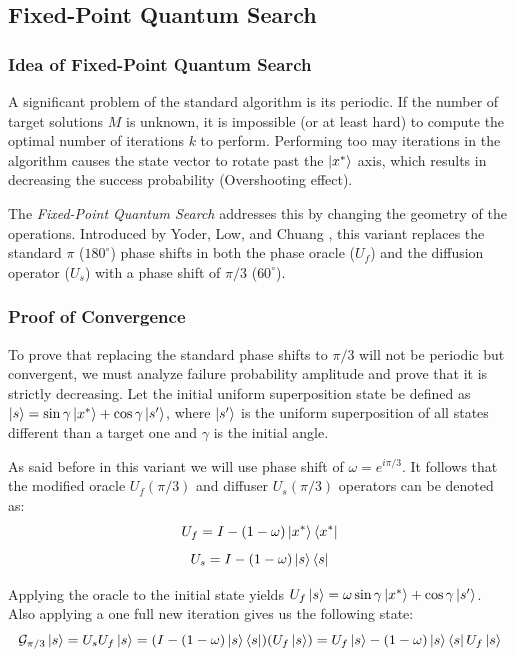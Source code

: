 \subsection{Fixed-Point Quantum Search}
%
%
\subsubsection{Idea of Fixed-Point Quantum Search}

A significant problem of the standard algorithm is its periodic. 
If the number of target solutions $M$ is unknown, it is impossible (or at least hard) to compute the optimal number of iterations $k$ to perform. 
Performing too may iterations in the algorithm causes the state vector to rotate past the $\ket{x^*}$ axis, which results in
decreasing the success probability (Overshooting effect).
%
%

\bigskip
The \textit{Fixed-Point Quantum Search} addresses this by changing the geometry of the operations. 
Introduced by Yoder, Low, and Chuang \cite{yoder2014fixed}, this variant replaces the standard $\pi$ ($180^\circ$) 
phase shifts in both the phase oracle ($U_f$) and the diffusion operator ($U_s$) with a phase shift of $\pi/3$ ($60^\circ$).
%
%


\subsubsection{Proof of Convergence}
%
%

To prove that replacing the standard phase shifts to $\pi/3$ will not be periodic but convergent, we must analyze failure probability amplitude and prove that it is 
strictly decreasing. 
Let the initial uniform superposition state be defined as $\ket{s} = \sin\gamma\ket{x^*} + \cos\gamma\ket{s'}$, 
where $\ket{s'}$ is the uniform superposition of all states different than a target one and $\gamma$ is the initial angle.
%
%

\bigskip
As said before in this variant we will use phase shift of $\omega = e^{i\pi/3}$. It follows that the modified oracle $U_f(\pi/3)$ and diffuser $U_s(\pi/3)$ operators 
can be denoted as:
\bigskip
\begin{equation}
    U_f = I - (1 - \omega)\ket{x^*}\bra{x^*}
\end{equation}
\bigskip
\begin{equation}
    U_s = I - (1 - \omega)\ket{s}\bra{s}
\end{equation}
%
%
\bigskip

Applying the oracle to the initial state yields $U_f \ket{s} = \omega\sin\gamma\ket{x^*} + \cos\gamma\ket{s'}$. 
Also applying a one full new iteration gives us the following state:
\bigskip
\begin{equation}
    \mathcal{G}_{\pi/3} \ket{s} = U_s U_f \ket{s} = (I - (1 - \omega)\ket{s}\bra{s}) (U_f \ket{s}) = U_f \ket{s} - (1 - \omega)\ket{s} \bra{s} U_f \ket{s}
\end{equation}
%
%
\bigskip


